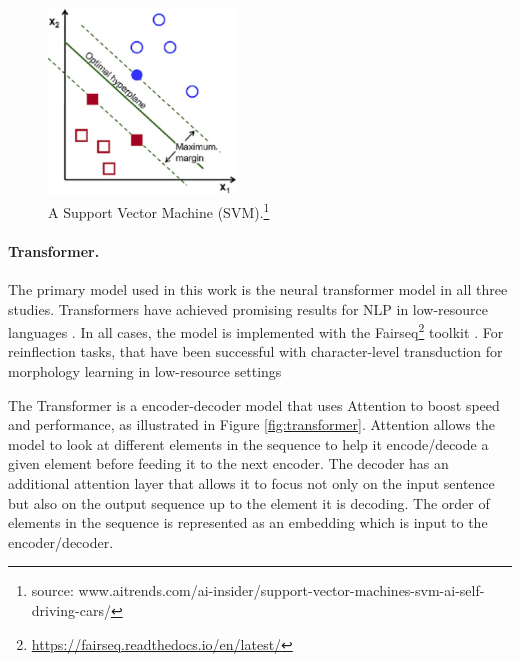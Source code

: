 
\begin{figure}
    \centering
    \includegraphics[width=5cm]{figs/SVM1.jpg}
    \caption[Support Vector Machine]{A Support Vector Machine (SVM).\footnote{source: www.aitrends.com/ai-insider/support-vector-machines-svm-ai-self-driving-cars/}}
    \label{fig:SVM}
\end{figure}

\paragraph{Transformer.} 
The primary model used in this work is the neural transformer model \citep{vaswani_attention_2017} in all three studies. Transformers have achieved promising results for NLP in low-resource languages \citep{abbott_towards_2018,Martinus2019AFO}. 
In all cases, the model is implemented with the Fairseq\footnote{\url{https://fairseq.readthedocs.io/en/latest/}} toolkit \citep{ott2019fairseq}.
For reinflection tasks, \citep{wu_applying_2020} that have been successful with character-level transduction  for morphology learning in low-resource settings


The Transformer is a encoder-decoder model that uses Attention to boost speed and performance, as illustrated in Figure \ref{fig:transformer}. Attention allows the model to look at different elements in the sequence to help it encode/decode a given element before feeding it to the next encoder. The decoder has an additional attention layer that allows it to focus not only on the input sentence but also on the output sequence up to the element it is decoding. The order of elements in the sequence is represented as an embedding which is input to the encoder/decoder. 

